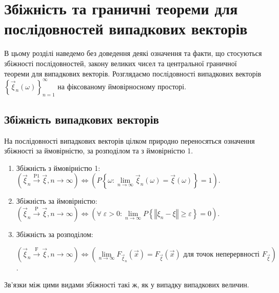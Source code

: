 \section{Збіжність та граничні теореми для послідовностей випадкових векторів}
В цьому розділі наведемо без доведення деякі означення та факти, що стосуються збіжності
послідовностей, закону великих чисел та центральної граничної теореми для випадкових векторів.
Розглядаємо послідовності випадкових векторів $\left\{ \vec{\xi}_n (\omega)\right\}_{n=1}^{\infty}$ на фіксованому
ймовірносному просторі.
\subsection{Збіжність випадкових векторів}
На послідовності випадкових векторів цілком природно переносяться означення збіжності за ймовірністю, за розподілом та з ймовірністю 1.
\begin{enumerate}
    \item Збіжність з ймовірністю 1: $\left(\vec{\xi}_n \overset{\mathrm{P1}}{\longrightarrow} \vec{\xi}, n \to \infty\right) \Leftrightarrow 
    \left(P\left\{ \omega: \underset{n\to\infty}{\lim} \vec{\xi}_n(\omega) = \vec{\xi}(\omega)\right\} = 1\right)$.
    \item Збіжність за ймовірністю: $\left(\vec{\xi}_n \overset{\mathrm{P}}{\longrightarrow} \vec{\xi}, n \to\infty\right) \Leftrightarrow
    \left(\forall \; \varepsilon > 0: \underset{n \to \infty}{\lim} P\left\{\left\Vert\xi_n - \xi\right\Vert \geq \varepsilon\right\}= 0\right)$.
    \item Збіжність за розподілом: 
    
    $\left(\vec{\xi}_n \overset{\mathrm{F}}{\longrightarrow} \vec{\xi}, n \to\infty\right) \Leftrightarrow
    \left(\underset{n\to\infty}{\lim}F_{\vec{\xi}_n}(\vec{x}) = F_{\vec{\xi}}(\vec{x}) \text{ для точок неперервності } F_{\vec{\xi}}\right)$.
\end{enumerate}
Зв'язки між цими видами збіжності такі ж, як у випадку випадкових величин.

